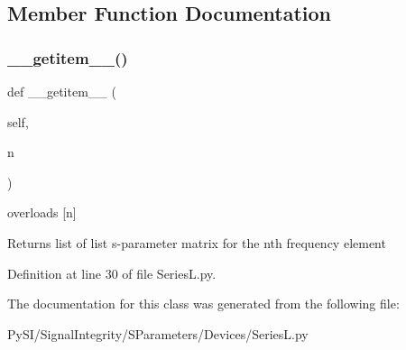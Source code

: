 \subsection{Member Function Documentation}
\mbox{\label{classSignalIntegrity_1_1SParameters_1_1Devices_1_1SeriesL_1_1SeriesL_ab7a6da5139e0878b590d68292aaa70f2}} 
\subsubsection{\texorpdfstring{\+\_\+\+\_\+getitem\+\_\+\+\_\+()}{\_\_getitem\_\_()}}
{\footnotesize\ttfamily def \+\_\+\+\_\+getitem\+\_\+\+\_\+ (\begin{DoxyParamCaption}\item[{}]{self,  }\item[{}]{n }\end{DoxyParamCaption})}



overloads \mbox{[}n\mbox{]} 

\begin{DoxyReturn}{Returns}
list of list s-\/parameter matrix for the nth frequency element 
\end{DoxyReturn}


Definition at line 30 of file Series\+L.\+py.



The documentation for this class was generated from the following file\+:\begin{DoxyCompactItemize}
\item 
Py\+S\+I/\+Signal\+Integrity/\+S\+Parameters/\+Devices/Series\+L.\+py\end{DoxyCompactItemize}
